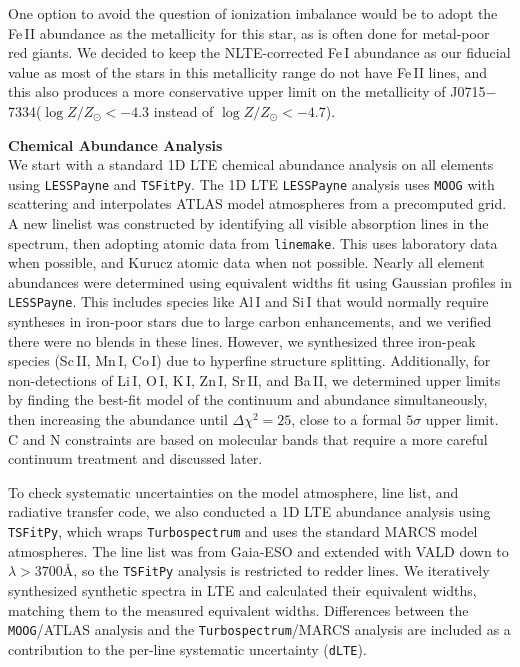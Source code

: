 \documentclass{natureprintstyle}
\newcommand{\code}[1]{\texttt{#1}\xspace}
\newcommand{\logzzsun}{\ensuremath{\log Z/Z_\odot}\xspace}
\newcommand{\umpstar}{J0715$-$7334\xspace}
\begin{document}
One option to avoid the question of ionization imbalance would be to adopt the Fe\,II abundance as the metallicity for this star, as is often done for metal-poor red giants\cite{Ji2020b,Martin2022}. We decided to keep the NLTE-corrected Fe\,I abundance as our fiducial value as most of the stars in this metallicity range do not have Fe\,II lines, and this also produces a more conservative upper limit on the metallicity of \umpstar ($\logzzsun<-4.3$ instead of $\logzzsun<-4.7$).

\vspace{1mm}
\noindent
{\bf Chemical Abundance Analysis}
\\
\noindent
We start with a standard 1D LTE chemical abundance analysis on all elements using \code{LESSPayne}{\cite{Ji2025ascl}} and \code{TSFitPy}{\cite{Gerber2023}}.
The 1D LTE \code{LESSPayne} analysis uses \code{MOOG} with scattering and interpolates ATLAS model atmospheres from a precomputed grid.
A new linelist was constructed by identifying all visible absorption lines in the spectrum, then adopting atomic data from {\code{linemake}}\cite{Placco2021}.
This uses laboratory data when possible, and Kurucz atomic data when not possible.
Nearly all element abundances were determined using equivalent widths fit using Gaussian profiles in \code{LESSPayne}.
This includes species like Al\,I and Si\,I that would normally require syntheses in iron-poor stars due to large carbon enhancements, and we verified there were no blends in these lines.
However, we synthesized three iron-peak species (Sc\,II, Mn\,I, Co\,I) due to hyperfine structure splitting.
Additionally, for non-detections of Li\,I, O\,I, K\,I, Zn\,I, Sr\,II, and Ba\,II, we determined upper limits by finding the best-fit model of the continuum and abundance simultaneously, then increasing the abundance until $\Delta\chi^2=25$, close to a formal $5\sigma$ upper limit\cite{Ji2020b}. C and N constraints are based on molecular bands that require a more careful continuum treatment and discussed later.

To check systematic uncertainties on the model atmosphere, line list, and radiative transfer code, we also conducted a 1D LTE abundance analysis using \code{TSFitPy}{\cite{Gerber2023}}, which wraps \code{Turbospectrum}{\cite{Plez2012}} and uses the standard MARCS model atmospheres\cite{Gustafsson2008}.
The line list was from Gaia-ESO\cite{Heiter2021} and extended with VALD\cite{VALD} down to $\lambda > 3700${\AA}, so the \code{TSFitPy} analysis is restricted to redder lines.
We iteratively synthesized synthetic spectra in LTE and calculated their equivalent widths, matching them to the measured equivalent widths.
Differences between the \code{MOOG}/ATLAS analysis and the \code{Turbospectrum}/MARCS analysis are included as a contribution to the per-line systematic uncertainty (\code{dLTE}).
\end{document}
